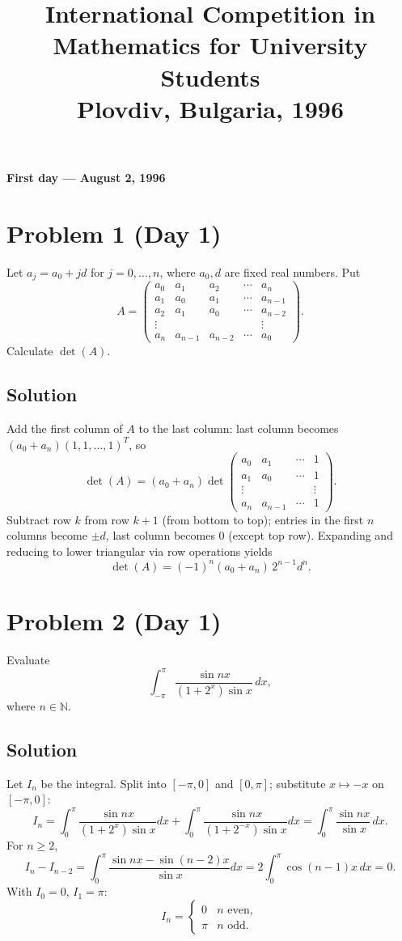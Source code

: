 \documentclass{article}
\title{International Competition in Mathematics for University Students\\
Plovdiv, Bulgaria, 1996}
\date{}
\begin{document}
\maketitle

\begin{center}\textbf{First day --- August 2, 1996}\end{center}

\section*{Problem 1 (Day 1)}
Let $a_j = a_0 + jd$ for $j = 0, \ldots, n$, where $a_0, d$ are fixed real numbers. Put
\[
A = \begin{pmatrix}
a_0 & a_1 & a_2 & \cdots & a_n \\
a_1 & a_0 & a_1 & \cdots & a_{n-1} \\
a_2 & a_1 & a_0 & \cdots & a_{n-2} \\
\vdots & & & & \vdots \\
a_n & a_{n-1} & a_{n-2} & \cdots & a_0
\end{pmatrix}.
\]
Calculate $\det(A)$.

\subsection*{Solution}
Add the first column of $A$ to the last column: last column becomes $(a_0+a_n)(1,1,\ldots,1)^T$, so
\[
\det(A) = (a_0+a_n) \det\begin{pmatrix}
a_0 & a_1 & \cdots & 1 \\
a_1 & a_0 & \cdots & 1 \\
\vdots & & & \vdots \\
a_n & a_{n-1} & \cdots & 1
\end{pmatrix}.
\]
Subtract row $k$ from row $k+1$ (from bottom to top); entries in the first $n$ columns become $\pm d$, last column becomes $0$ (except top row). Expanding and reducing to lower triangular via row operations yields
\[
\det(A) = (-1)^n (a_0+a_n)\, 2^{n-1} d^n.
\]

\section*{Problem 2 (Day 1)}
Evaluate
\[
\int_{-\pi}^{\pi} \frac{\sin nx}{(1+2^x)\sin x}\,dx,
\]
where $n \in \mathbb{N}$.

\subsection*{Solution}
Let $I_n$ be the integral. Split into $[-\pi,0]$ and $[0,\pi]$; substitute $x \mapsto -x$ on $[-\pi,0]$:
\[
I_n = \int_0^\pi \frac{\sin nx}{(1+2^x)\sin x}dx + \int_0^\pi \frac{\sin nx}{(1+2^{-x})\sin x}dx
= \int_0^\pi \frac{\sin nx}{\sin x}\,dx.
\]
For $n \geq 2$,
\[
I_n - I_{n-2} = \int_0^\pi \frac{\sin nx - \sin(n-2)x}{\sin x}dx = 2\int_0^\pi \cos(n-1)x\,dx = 0.
\]
With $I_0 = 0$, $I_1 = \pi$:
\[
I_n = \begin{cases} 0 & n \text{ even},\\ \pi & n \text{ odd}. \end{cases}
\]
\end{document}
